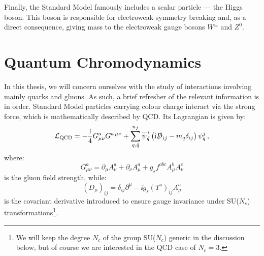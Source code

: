 \documentclass[main.tex]{subfiles}
\begin{document}
Finally, the Standard Model famously includes a scalar particle --- the Higgs boson. This boson is responsible for electroweak symmetry breaking and, as a direct consequence, giving mass to the electroweak gauge bosons $W^\pm$ and $Z^0$. 
\section{Quantum Chromodynamics} \label{sec:QCD}
In this thesis, we will concern ourselves with the study of interactions involving mainly quarks and gluons. As such, a brief refresher of the relevant information is in order. Standard Model particles carrying colour charge interact via the strong force, which is mathematically described by QCD.  Its Lagrangian is given by:
\begin{equation} \label{eq:QCDLagrangian}
    \mathcal{L}_{\text{QCD}} = -\frac{1}{4} G^a_{\mu\nu} G^{a\,\mu\nu} + \sum_{q,\bar{q}}^{n_f} \overline{\psi}_{\bar{q}}^{\,i} \left(\mathrm{i} \slashed{D}_{ij} - m_q \delta_{ij} \right) \psi_q^j\,,
\end{equation}
where:
\begin{equation}
     G^a_{\mu\nu} = \partial_\mu A^a_\nu + \partial_\nu A^a_\mu + g_s f^{abc} A^b_\mu A^c_\nu
\end{equation}
is the gluon field strength, while:
\begin{equation}
    (D_\mu)_{ij} = \delta_{ij} \partial^\mu - \ii g_s (T^a)_{ij} A^a_\mu
\end{equation}
is the covariant derivative introduced to ensure gauge invariance under SU($N_c$) transformations\footnote{We will keep the degree $N_c$ of the group SU($N_c$) generic in the discussion below, but of course we are interested in the QCD case of $N_c=3$.}.
\end{document}
